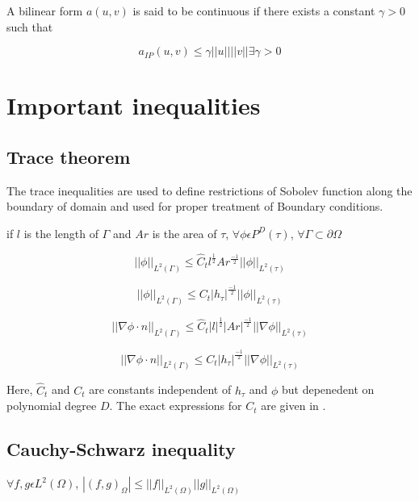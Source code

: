\documentclass[a4paper,12pt]{book}
\begin{document}
A bilinear form $a(u,v)$ is said to be continuous if there exists a constant $\gamma > 0$ such that

\begin{equation}\label{Continuity_constant}
a_{IP}(u,v) \leq \gamma ||u||||v||   \exists   \gamma > 0
\end{equation}

\section{Important inequalities}

\subsection{Trace theorem} \cite{riviere}

The trace inequalities are used to define restrictions of Sobolev function along the boundary of domain and used for proper treatment of Boundary conditions. 

if $l$ is the length of $\Gamma$ and $Ar$ is the area of $\tau$,  $\forall \phi \epsilon P^D (\tau)$, $\forall \Gamma \subset \partial \Omega$

\begin{equation}
||\phi||_{L^2(\Gamma)} \leq \hat{C}_t l^{\frac{1}{2}} Ar^{\frac{-1}{2}} ||\phi||_{L^2(\tau)}
\end{equation}

\begin{equation}
||\phi||_{L^2(\Gamma)} \leq {C}_t |h_\tau|^{\frac{-1}{2}} ||\phi||_{L^2(\tau)}
\end{equation}

\begin{equation}
||\nabla \phi \cdot n||_{L^2(\Gamma)} \leq \hat{C}_t |l|^{\frac{1}{2}} |Ar|^{\frac{-1}{2}} ||\nabla \phi||_{L^2(\tau)}
\end{equation}

\begin{equation}
||\nabla \phi \cdot n||_{L^2(\Gamma)} \leq {C}_t |h_\tau|^{\frac{-1}{2}} ||\nabla \phi||_{L^2(\tau)}
\end{equation}

Here, $\hat{C}_t$ and ${C}_t$ are constants independent of $h_\tau$ and $\phi$ but depenedent on polynomial degree $D$. The exact expressions for $C_t$ are given in \cite{warburton}.

\subsection{Cauchy-Schwarz inequality} 
\begin{center}
$\forall f,g \epsilon L^2(\Omega)$, $|(f,g)_{\Omega}| \leq ||f||_{L^2(\Omega)} ||g||_{L^2(\Omega)}$ \\
\end{center}
\end{document}

